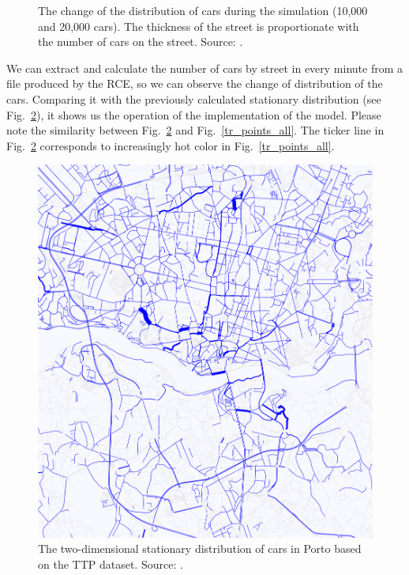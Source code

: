 \documentclass[b5paper,12pt]{report}
\theoremstyle{definition}
\begin{document}
\begin{figure}[!h]
    \hspace{0em}
    \hspace{0em}
    \hspace{0em}
    \caption{The change of the distribution of cars during the simulation (10,000 and 20,000 cars). The thickness of the street is proportionate with the number of cars on the street. Source: \cite{traffic-paper}.}
    \label{cardist}
\end{figure}

We can extract and calculate the number of cars by street in every minute from a file produced by the RCE, so we can observe the change of distribution of the cars. Comparing it with the previously calculated stationary distribution (see Fig.~\ref{porto_stat_dist}), it shows us the operation of the implementation of the model. Please note the similarity between Fig.~\ref{porto_stat_dist} and Fig.~\ref{tr_points_all}. The ticker line in Fig.~\ref{porto_stat_dist} corresponds to increasingly hot color in Fig.~\ref{tr_points_all}.

\begin{figure}[!b]
    \centering
    \includegraphics[width=.4\textwidth]{img/porto_stat_dist.png}
    \caption{The two-dimensional stationary distribution of cars in Porto based on the TTP dataset. Source: \cite{traffic-paper}.}
    \label{porto_stat_dist}
\end{figure}
\end{document}
